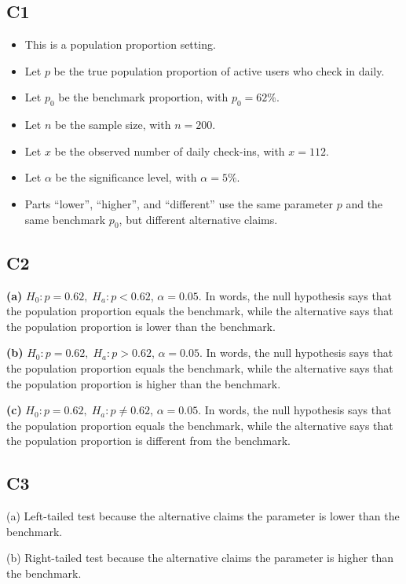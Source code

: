 \begin{ExamProblems}
		\subsection*{C1}
		\begin{itemize}
			\item This is a population proportion setting.
			\item Let \(p\) be the true population proportion of active users who check in daily.
			\item Let \(p_0\) be the benchmark proportion, with \(p_0=62\%\).
			\item Let \(n\) be the sample size, with \(n=200\).
			\item Let \(x\) be the observed number of daily check-ins, with \(x=112\).
			\item Let \(\alpha\) be the significance level, with \(\alpha=5\%\).
			\item Parts ``lower'', ``higher'', and ``different'' use the same parameter \(p\) and the same benchmark \(p_0\), but different alternative claims.
		\end{itemize}
		
		\subsection*{C2}
		\textbf{(a)} \(H_0\colon p=0.62,\; H_a\colon p<0.62\), \(\alpha=0.05\). In words, the null hypothesis says that the population proportion equals the benchmark, while the alternative says that the population proportion is lower than the benchmark.
		
		\textbf{(b)} \(H_0\colon p=0.62,\; H_a\colon p>0.62\), \(\alpha=0.05\). In words, the null hypothesis says that the population proportion equals the benchmark, while the alternative says that the population proportion is higher than the benchmark.
		
		\textbf{(c)} \(H_0\colon p=0.62,\; H_a\colon p\ne 0.62\), \(\alpha=0.05\). In words, the null hypothesis says that the population proportion equals the benchmark, while the alternative says that the population proportion is different from the benchmark.
		
		\subsection*{C3}
		(a) Left-tailed test because the alternative claims the parameter is lower than the benchmark.\LeftTailGraph
		
		(b) Right-tailed test because the alternative claims the parameter is higher than the benchmark.\RightTailGraph
		

\end{ExamProblems}
